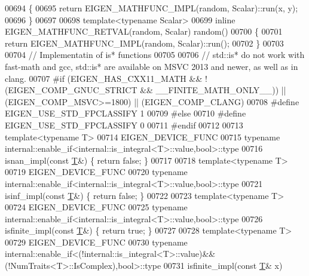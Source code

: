 \begin{DoxyCode}
00694 \{
00695   \textcolor{keywordflow}{return} EIGEN\_MATHFUNC\_IMPL(random, Scalar)::run(x, y);
00696 \}
00697 
00698 \textcolor{keyword}{template}<\textcolor{keyword}{typename} Scalar>
00699 \textcolor{keyword}{inline} EIGEN\_MATHFUNC\_RETVAL(random, Scalar) random()
00700 \{
00701   \textcolor{keywordflow}{return} EIGEN\_MATHFUNC\_IMPL(random, Scalar)::run();
00702 \}
00703 
00704 \textcolor{comment}{// Implementatin of is* functions}
00705 
00706 \textcolor{comment}{// std::is* do not work with fast-math and gcc, std::is* are available on MSVC 2013 and newer, as well as
       in clang.}
00707 \textcolor{preprocessor}{#if (EIGEN\_HAS\_CXX11\_MATH && !(EIGEN\_COMP\_GNUC\_STRICT && \_\_FINITE\_MATH\_ONLY\_\_)) || (EIGEN\_COMP\_MSVC>=1800)
       || (EIGEN\_COMP\_CLANG)}
00708 \textcolor{preprocessor}{#define EIGEN\_USE\_STD\_FPCLASSIFY 1}
00709 \textcolor{preprocessor}{#else}
00710 \textcolor{preprocessor}{#define EIGEN\_USE\_STD\_FPCLASSIFY 0}
00711 \textcolor{preprocessor}{#endif}
00712 
00713 \textcolor{keyword}{template}<\textcolor{keyword}{typename} T>
00714 EIGEN\_DEVICE\_FUNC
00715 \textcolor{keyword}{typename} internal::enable\_if<internal::is\_integral<T>::value,\textcolor{keywordtype}{bool}>::type
00716 isnan\_impl(\textcolor{keyword}{const} \hyperlink{group___sparse_core___module_class_eigen_1_1_triplet}{T}&) \{ \textcolor{keywordflow}{return} \textcolor{keyword}{false}; \}
00717 
00718 \textcolor{keyword}{template}<\textcolor{keyword}{typename} T>
00719 EIGEN\_DEVICE\_FUNC
00720 \textcolor{keyword}{typename} internal::enable\_if<internal::is\_integral<T>::value,\textcolor{keywordtype}{bool}>::type
00721 isinf\_impl(\textcolor{keyword}{const} \hyperlink{group___sparse_core___module_class_eigen_1_1_triplet}{T}&) \{ \textcolor{keywordflow}{return} \textcolor{keyword}{false}; \}
00722 
00723 \textcolor{keyword}{template}<\textcolor{keyword}{typename} T>
00724 EIGEN\_DEVICE\_FUNC
00725 \textcolor{keyword}{typename} internal::enable\_if<internal::is\_integral<T>::value,\textcolor{keywordtype}{bool}>::type
00726 isfinite\_impl(\textcolor{keyword}{const} \hyperlink{group___sparse_core___module_class_eigen_1_1_triplet}{T}&) \{ \textcolor{keywordflow}{return} \textcolor{keyword}{true}; \}
00727 
00728 \textcolor{keyword}{template}<\textcolor{keyword}{typename} T>
00729 EIGEN\_DEVICE\_FUNC
00730 \textcolor{keyword}{typename} internal::enable\_if<(!internal::is\_integral<T>::value)&&(!NumTraits<T>::IsComplex),\textcolor{keywordtype}{bool}>::type
00731 isfinite\_impl(\textcolor{keyword}{const} \hyperlink{group___sparse_core___module_class_eigen_1_1_triplet}{T}& x)

\end{DoxyCode}
